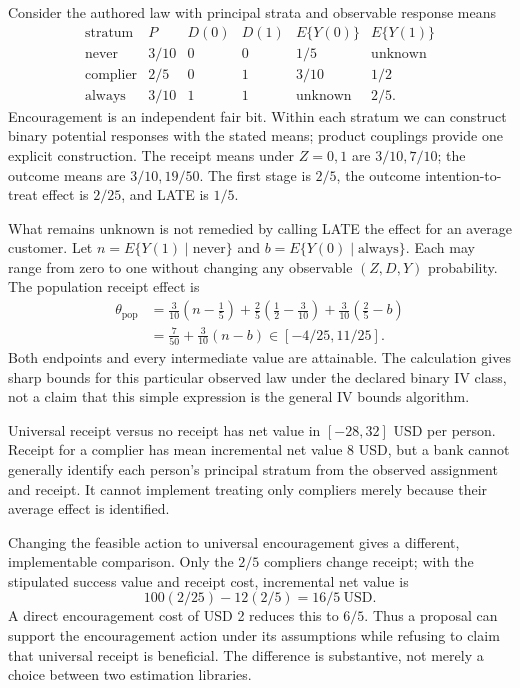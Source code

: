 Consider the authored law with principal strata and observable
response means
\[
\begin{array}{c|c|cc|cc}
 \text{stratum}&P&D(0)&D(1)&E\{Y(0)\}&E\{Y(1)\}\\ \hline
 \text{never}&3/10&0&0&1/5&\text{unknown}\\
 \text{complier}&2/5&0&1&3/10&1/2\\
 \text{always}&3/10&1&1&\text{unknown}&2/5 .
\end{array}
\]
Encouragement is an independent fair bit. Within each stratum
we can construct binary potential responses with the stated
means; product couplings provide one explicit construction.
The receipt means under $Z=0,1$ are $3/10,7/10$;
the outcome means are $3/10,19/50$. The first stage is $2/5$,
the outcome intention-to-treat effect is $2/25$, and LATE is
$1/5$.~\citep{exec17_s3_exact}

What remains unknown is not remedied by calling LATE the effect
for an average customer. Let $n=E\{Y(1)\mid\text{never}\}$
and $b=E\{Y(0)\mid\text{always}\}$. Each may range from zero
to one without changing any observable $(Z,D,Y)$ probability.
The population receipt effect is
\begin{align*}
 \theta_{\mathrm{pop}}
 &=\tfrac3{10}(n-\tfrac15)
   +\tfrac25(\tfrac12-\tfrac3{10})
   +\tfrac3{10}(\tfrac25-b)\\
 &=\tfrac7{50}+\tfrac3{10}(n-b)
   \in[-4/25,11/25].
\end{align*}
Both endpoints and every intermediate value are attainable.
The calculation gives sharp bounds for this particular observed
law under the declared binary IV class, not a claim that this
simple expression is the general IV bounds algorithm.

Universal receipt versus no receipt has net value
in $[-28,32]$ USD per person. Receipt for a complier has mean
incremental net value $8$ USD, but a bank cannot generally
identify each person's principal stratum from the observed
assignment and receipt. It cannot implement treating only
compliers merely because their average effect is
identified.~\citep{angrist1996,exec17_s3_exact}

Changing the feasible action to universal encouragement gives
a different, implementable comparison. Only the $2/5$ compliers
change receipt; with the stipulated success value and receipt
cost, incremental net value is
\[
 100(2/25)-12(2/5)=16/5\ \text{USD}.
\]
A direct encouragement cost of USD 2 reduces this to $6/5$.
Thus a proposal can support the encouragement action under its
assumptions while refusing to claim that universal receipt is
beneficial. The difference is substantive, not merely a choice
between two estimation libraries.

